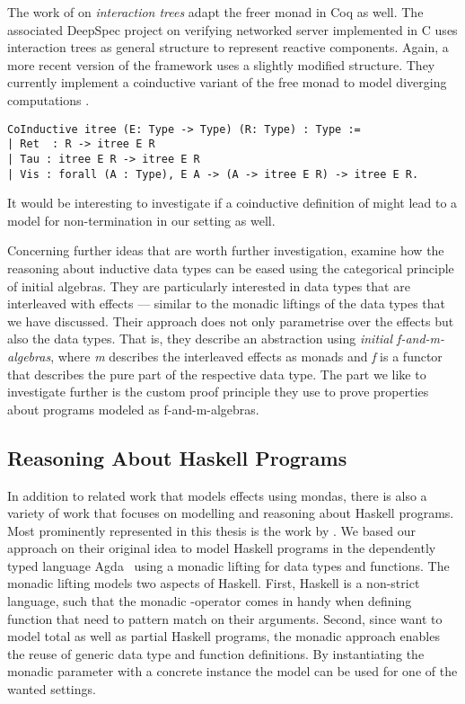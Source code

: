 The work of \citet{koh2019interaction} on \emph{interaction trees} adapt the freer monad in Coq as well.
The associated DeepSpec project on verifying networked server implemented in C uses interaction trees as general structure to represent reactive components.
Again,  a more recent version of the framework uses a slightly modified structure.
They currently implement a coinductive variant of the free monad to model diverging computations \citep{xia2019interaction}.

\begin{verbatim}
CoInductive itree (E: Type -> Type) (R: Type) : Type :=
| Ret  : R -> itree E R
| Tau : itree E R -> itree E R
| Vis : forall (A : Type), E A -> (A -> itree E R) -> itree E R.
\end{verbatim}

It would be interesting to investigate if a coinductive definition of  might lead to a model for non-termination in our setting as well.

Concerning further ideas that are worth further investigation, \citet{atkey2015interleaving} examine how the reasoning about
inductive data types can be eased using the categorical principle of initial algebras.
They are particularly interested in data types that are interleaved with effects --- similar to the monadic liftings of the data types that we have discussed.
Their approach does not only parametrise over the effects but also the data types.
That is, they describe an abstraction using \emph{initial f-and-m-algebras}, where \emph{m} describes the interleaved effects as monads and \emph{f} is a functor that describes the pure part of the respective data type.
The part we like to investigate further is the custom proof principle they use to prove properties about programs modeled as f-and-m-algebras.


\subsection{Reasoning About Haskell Programs}

In addition to related work that models effects using mondas, there is also a variety of work that focuses on modelling and reasoning about Haskell programs.
Most prominently represented in this thesis is the work by \citet{abel2005verifying}.
We based our approach on their original idea to model Haskell programs in the dependently typed language Agda~\citep{norell2008dependently} using a monadic lifting for data types and functions.
The monadic lifting models two aspects of Haskell.
First, Haskell is a non-strict language, such that the monadic \hinl{>>=}-operator comes in handy when defining function that need to pattern match on their arguments.
Second, since \citeauthor{abel2005verifying} want to model total as well as partial Haskell programs, the monadic approach enables the reuse of generic data type and function definitions.
By instantiating the monadic parameter with a concrete instance the model can be used for one of the wanted settings.

